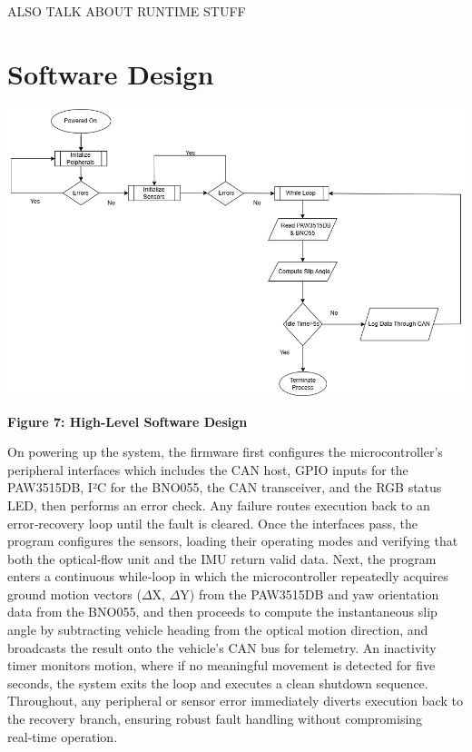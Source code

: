 \documentclass[12pt]{article}
\begin{document}
            ALSO TALK ABOUT RUNTIME STUFF

    \section{Software Design}

        \begin{center}
            \vspace{0.5cm}

            \includegraphics[width=1\textwidth]{resources/softwarediagram.png}

            \vspace{0.5cm}

            \textbf{Figure 7: High-Level Software Design}
            \label{sd}
        
        \end{center}

        On powering up the system, the firmware first configures the microcontroller’s peripheral interfaces which includes the CAN host, GPIO inputs for 
        the PAW3515DB, I²C for the BNO055, the CAN transceiver, and the RGB status LED, then performs an error check. Any failure routes execution back to an 
        error‑recovery loop until the fault is cleared. Once the interfaces pass, the program configures the sensors, loading their operating modes and verifying 
        that both the optical‑flow unit and the IMU return valid data. Next, the program enters a continuous while‑loop in which the microcontroller repeatedly 
        acquires ground motion vectors ($\Delta$X, $\Delta$Y) from the PAW3515DB and yaw orientation data from the BNO055, and then proceeds to compute the instantaneous slip 
        angle by subtracting vehicle heading from the optical motion direction, and broadcasts the result onto the vehicle’s CAN bus for telemetry. An inactivity 
        timer monitors motion, where if no meaningful movement is detected for five seconds, the system exits the loop and executes a clean shutdown sequence. 
        Throughout, any peripheral or sensor error immediately diverts execution back to the recovery branch, ensuring robust fault handling without compromising 
        real‑time operation.
    
\end{document}

